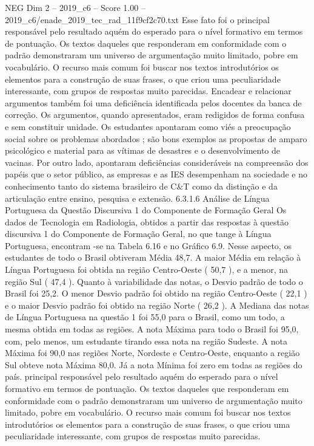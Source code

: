\begin{textsample}{NEG Dim 2 – 2019\_c6 – Score 1.00 – 2019\_c6/enade\_2019\_tec\_rad\_11f9cf2c70.txt}
Esse fato foi o principal responsável pelo resultado aquém do esperado para o nível formativo em termos de pontuação.
Os textos daqueles que responderam em conformidade com o padrão demonstraram um universo de argumentação muito limitado, pobre em vocabulário.
O recurso mais comum foi buscar nos textos introdutórios os elementos para a construção de suas frases, o que criou uma peculiaridade interessante, com grupos de respostas muito parecidas.
Encadear e relacionar argumentos também foi uma deficiência identificada pelos docentes da banca de correção.
Os argumentos, quando apresentados, eram redigidos de forma confusa e sem constituir unidade.
Os estudantes apontaram como viés a preocupação social sobre os problemas abordados ; são bons exemplos as propostas de amparo psicológico e material para as vítimas de desastres e o desenvolvimento de vacinas.
Por outro lado, apontaram deficiências consideráveis na compreensão dos papéis que o setor público, as empresas e as IES desempenham na sociedade e no conhecimento tanto do sistema brasileiro de C\&T como da distinção e da articulação entre ensino, pesquisa e extensão. 6.3.1.6 Análise de Língua Portuguesa da Questão Discursiva 1 do Componente de Formação Geral Os dados de Tecnologia em Radiologia, obtidos a partir das respostas à questão discursiva 1 do Componente de Formação Geral, no que tange à Língua Portuguesa, encontram -se na Tabela 6.16 e no Gráfico 6.9.
Nesse aspecto, os estudantes de todo o Brasil obtiveram Média 48,7.
A maior Média em relação à Língua Portuguesa foi obtida na região Centro-Oeste ( 50,7 ), e a menor, na região Sul ( 47,4 ).
Quanto à variabilidade das notas, o Desvio padrão de todo o Brasil foi 25,2.
O menor Desvio padrão foi obtido na região Centro-Oeste ( 22,1 ) e o maior Desvio padrão foi obtido na região Norte ( 26,2 ).
A Mediana das notas de Língua Portuguesa na questão 1 foi 55,0 para o Brasil, como um todo, a mesma obtida em todas as regiões.
A nota Máxima para todo o Brasil foi 95,0, com, pelo menos, um estudante tirando essa nota na região Sudeste.
A nota Máxima foi 90,0 nas regiões Norte, Nordeste e Centro-Oeste, enquanto a região Sul obteve nota Máxima 80,0.
Já a nota Mínima foi zero em todas as regiões do país. principal responsável pelo resultado aquém do esperado para o nível formativo em termos de pontuação.
Os textos daqueles que responderam em conformidade com o padrão demonstraram um universo de argumentação muito limitado, pobre em vocabulário.
O recurso mais comum foi buscar nos textos introdutórios os elementos para a construção de suas frases, o que criou uma peculiaridade interessante, com grupos de respostas muito parecidas.

\end{textsample}
